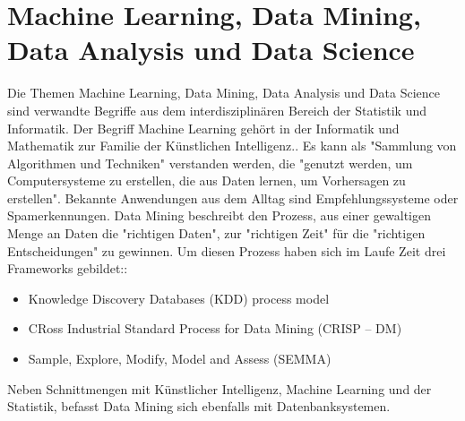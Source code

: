 \section{Machine Learning, Data Mining, Data Analysis und Data Science}\label{sec:DataMining}
Die Themen Machine Learning, Data Mining, Data Analysis und Data Science sind verwandte Begriffe aus dem interdisziplinären Bereich der Statistik und Informatik.  \newline
Der Begriff Machine Learning gehört in der Informatik und Mathematik zur Familie der Künstlichen Intelligenz.. Es kann als "Sammlung von Algorithmen und Techniken" verstanden werden, die "genutzt werden, um Computersysteme zu erstellen, die aus Daten lernen, um Vorhersagen zu erstellen".\citep[S.~53; eigene Übersetzung]{swamynathan_mastering_2017} Bekannte Anwendungen aus dem Alltag sind Empfehlungssysteme oder Spamerkennungen.\citep[S.~53]{swamynathan_mastering_2017}\newline
Data Mining beschreibt den Prozess, aus einer gewaltigen Menge an Daten die "richtigen Daten", zur "richtigen Zeit" für die "richtigen Entscheidungen"\citep[S.~61; eigene Übersetzung]{swamynathan_mastering_2017} zu gewinnen. Um diesen Prozess haben sich im Laufe Zeit drei Frameworks gebildet:\citep[S.~69]{swamynathan_mastering_2017}:
\begin{itemize}
\item Knowledge Discovery Databases (KDD) process model
\item CRoss Industrial Standard Process for Data Mining (CRISP – DM)
\item Sample, Explore, Modify, Model and Assess (SEMMA)
\end{itemize}
Neben Schnittmengen mit Künstlicher Intelligenz, Machine Learning und der Statistik, befasst Data Mining sich ebenfalls mit Datenbanksystemen.\citep[S.~4]{ramasubramanian_machine_2017}

